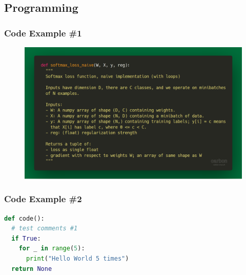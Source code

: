 \documentclass{presentation-beamer}
\begin{document}
\subsection{Programming}
\begin{frame}[fragile]

\frametitle{Code Example \#1}

\begin{figure}
\centering
\includegraphics[width=\linewidth]{carbon.png}
\end{figure}

\end{frame}

\begin{frame}[fragile]
\frametitle{Code Example \#2}


\begin{lstlisting}[language=Python]
def code():
  # test comments #1    
  if True:
    for _ in range(5):
      print("Hello World 5 times")
  return None     
\end{lstlisting}

\end{frame}
\end{document}

